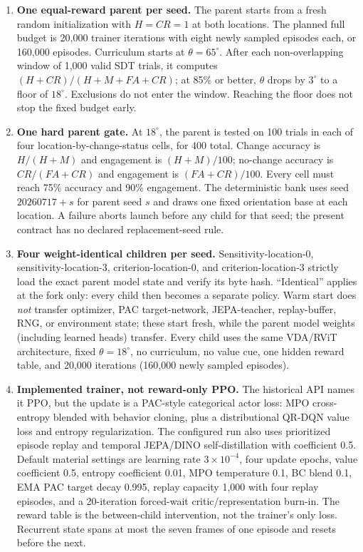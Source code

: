 \documentclass[10pt]{article}
\newcommand{\code}[1]{\texttt{\detokenize{#1}}}
\begin{document}
\begin{enumerate}[leftmargin=1.5em,itemsep=4pt]
\item \textbf{One equal-reward parent per seed.} The parent starts from a fresh random initialization with $H=CR=1$ at both locations. The planned full budget is 20,000 trainer iterations with eight newly sampled episodes each, or 160,000 episodes. Curriculum starts at $\theta=65^\circ$. After each non-overlapping window of 1,000 valid SDT trials, it computes $(H+CR)/(H+M+FA+CR)$; at 85\% or better, $\theta$ drops by $3^\circ$ to a floor of $18^\circ$. Exclusions do not enter the window. Reaching the floor does not stop the fixed budget early.
\item \textbf{One hard parent gate.} At $18^\circ$, the parent is tested on 100 trials in each of four location-by-change-status cells, for 400 total. Change accuracy is $H/(H+M)$ and engagement is $(H+M)/100$; no-change accuracy is $CR/(FA+CR)$ and engagement is $(FA+CR)/100$. Every cell must reach 75\% accuracy and 90\% engagement. The deterministic bank uses seed $20260717+s$ for parent seed $s$ and draws one fixed orientation base at each location. A failure aborts launch before any child for that seed; the present contract has no declared replacement-seed rule.
\item \textbf{Four weight-identical children per seed.} Sensitivity-location-0, sensitivity-location-3, criterion-location-0, and criterion-location-3 strictly load the exact parent model state and verify its byte hash. ``Identical'' applies at the fork only: every child then becomes a separate policy. Warm start does \emph{not} transfer optimizer, PAC target-network, JEPA-teacher, replay-buffer, RNG, or environment state; these start fresh, while the parent model weights (including learned heads) transfer. Every child uses the same VDA/RViT \code{affine_ew} architecture, fixed $\theta=18^\circ$, no curriculum, no value cue, one hidden reward table, and 20,000 iterations (160,000 newly sampled episodes).
\item \textbf{Implemented trainer, not reward-only PPO.} The historical API names it PPO, but the update is a PAC-style categorical actor loss: MPO cross-entropy blended with behavior cloning, plus a distributional QR-DQN value loss and entropy regularization. The configured run also uses prioritized episode replay and temporal JEPA/DINO self-distillation with coefficient 0.5. Default material settings are learning rate $3\times10^{-4}$, four update epochs, value coefficient 0.5, entropy coefficient 0.01, MPO temperature 0.1, BC blend 0.1, EMA PAC target decay 0.995, replay capacity 1,000 with four replay episodes, and a 20-iteration forced-wait critic/representation burn-in. The reward table is the between-child intervention, not the trainer's only loss. Recurrent state spans at most the seven frames of one episode and resets before the next.

\end{enumerate}
\end{document}
